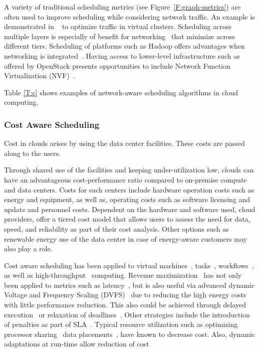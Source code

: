 \documentclass[final,5p,times,twocolumn]{elsarticle}
\newcommand{\TODO}[1]{\todo[inline]{#1}}
\begin{document}
\TODO{THIS FIGURE IS MISSING}

A variety of traditional scheduling metrics (see Figure~\ref{F:graph-metrics}) are often used to improve scheduling while considering network traffic. An example is demonstrated in ~\cite{yu2017survivable} to optimize traffic in virtual clusters. Scheduling across multiple layers is especially of benefit for networking~\cite{bi2015sla} that minimize across different tiers. Scheduling of platforms such as Hadoop offers advantages when networking is integrated~\cite{kondikoppa2012network}. Having access to lower-level infrastructure such as offered by OpenStack presents opportunities to include Network Function Virtualization (NVF)~\cite{lucrezia2015introducing}.

Table \ref{T:c} shows examples of network-aware scheduling algorithms in cloud computing.



%


\subsubsection{Cost Aware Scheduling}\label{sec:cost}


Cost in clouds arises by using the data center facilities. These costs are passed along to the users.

Through shared use of the facilities and keeping under-utilization low, clouds can have an advantageous cost-performance ratio compared to on-premise compute and data centers. Costs for such centers include hardware operation costs such as energy and equipment, as well as, operating costs such as software licensing and update and personnel costs. Dependent on the hardware and software used, cloud providers, offer a tiered cost model that allows users to assess the need for data, speed, and reliability as part of their cost analysis. Other options such as renewable energy use of the data center in case of energy-aware customers may also play a role.

Cost aware scheduling has been applied to virtual machines~\cite{yuan2017ttsa}, tasks~\cite{yuan2017temporal,zuo2015multi}, workflows~\cite{arabnejad2015cost,arabnejad2016budget}, as well as high-throughput~\cite{yuan2016cawsac} computing. Revenue maximization~\cite{yuan2018warm} has not only been applied to metrics such as latency~\cite{ghahramani2017toward}, but is also useful via advanced dynamic Voltage and Frequency Scaling (DVFS)~\cite{las10cloudsched,calheiros2014energy} due to reducing the high energy costs with little performance reduction. This also could be achieved through delayed execution~\cite{bi2016trs} or relaxation of deadlines~\cite{zhang2018dynamic}. Other strategies include the introduction of penalties as part of SLA~\cite{wu2012sla}. Typical resource utilization such as optimizing processor sharing~\cite{lee2012profit} data placements~\cite{lee2012profit}, have known to decrease cost. Also, dynamic adaptations at run-time allow reduction of cost~\cite{ari2013design}
\end{document}
